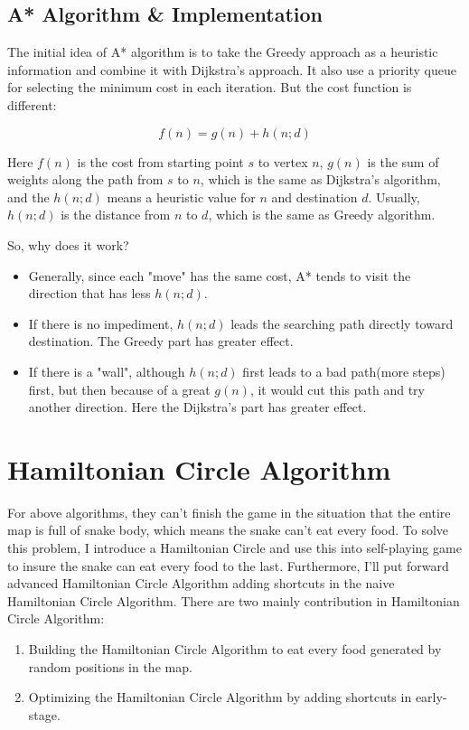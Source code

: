 \documentclass[12pt]{article}
\begin{document}
\subsection{A* Algorithm \& Implementation}

The initial idea of A* algorithm is to take the Greedy approach as a heuristic information and combine it with Dijkstra's approach. It also use a priority queue for selecting the minimum cost in each iteration. But the cost function is different:

\begin{equation*}
    f(n) = g(n) + h(n;d)
\end{equation*}

Here $f(n)$ is the cost from starting point $s$ to vertex $n$, $g(n)$ is the sum of weights 
along the path from $s$ to $n$, which is the same as Dijkstra's algorithm, and the $h(n;d)$ 
means a heuristic value for $n$ and destination $d$. Usually, $h(n;d)$ is the distance from $n$ 
to $d$, which is the same as Greedy algorithm.

So, why does it work?

\begin{itemize}
    \item Generally, since each "move" has the same cost, A* tends to visit the direction that has less $h(n;d)$.
    \item If there is no impediment, $h(n;d)$ leads the searching path directly toward destination. The Greedy part has greater effect.
    \item If there is a "wall", although $h(n;d)$ first leads to a bad path(more steps) first, but then because of a great $g(n)$, it would cut this path and try another direction. Here the Dijkstra's part has greater effect.
\end{itemize}

\section{Hamiltonian Circle Algorithm}

For above algorithms, they can't finish the game in the situation that the entire map is full of snake body, which means the snake can't eat every food. To solve this problem, I introduce a Hamiltonian Circle and use this into self-playing game to insure the snake can eat every food to the last. Furthermore, I'll put forward advanced Hamiltonian Circle Algorithm adding shortcuts in the naive Hamiltonian Circle Algorithm. There are two mainly contribution in Hamiltonian Circle Algorithm:
\begin{enumerate}
    \item Building the Hamiltonian Circle Algorithm to eat every food generated by random positions in the map. 
    \item Optimizing the Hamiltonian Circle Algorithm by adding shortcuts in early-stage.
\end{enumerate}
    
\end{document}
